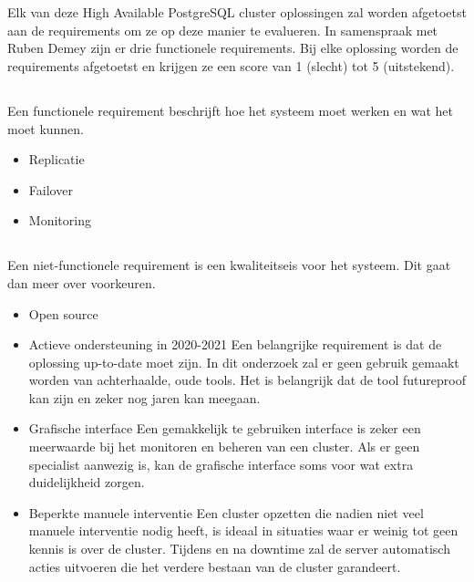 \section{}
\label{sec:Requirementsanalyse}

Elk van deze High Available PostgreSQL cluster oplossingen zal worden afgetoetst aan de requirements om ze op deze manier te evalueren. In samenspraak met Ruben Demey zijn er drie functionele requirements. Bij elke oplossing worden de requirements afgetoetst en krijgen ze een score van 1 (slecht) tot 5 (uitstekend).


\subsection{}
\label{subsec:Functionele Requirements}
Een functionele requirement beschrijft hoe het systeem moet werken en wat het moet kunnen.

\begin{itemize}
    \item Replicatie
    \item Failover
    \item Monitoring
\end{itemize}


\subsection{}
\label{subsec:Niet-functionele Requirements}
Een niet-functionele requirement is een kwaliteitseis voor het systeem. Dit gaat dan meer over voorkeuren.

\begin{itemize}
    \item Open source
    \item Actieve ondersteuning in 2020-2021
    \newline
    Een belangrijke requirement is dat de oplossing up-to-date moet zijn. In dit onderzoek zal er geen gebruik gemaakt worden van achterhaalde, oude tools. Het is belangrijk dat de tool futureproof kan zijn en zeker nog jaren kan meegaan.
    \item Grafische interface
    \newline
    Een gemakkelijk te gebruiken interface is zeker een meerwaarde bij het monitoren en beheren van een cluster. Als er geen specialist aanwezig is, kan de grafische interface soms voor wat extra duidelijkheid zorgen.
    \item Beperkte manuele interventie
    \newline
    Een cluster opzetten die nadien niet veel manuele interventie nodig heeft, is ideaal in situaties waar er weinig tot geen kennis is over de cluster. Tijdens en na downtime zal de server automatisch acties uitvoeren die het verdere bestaan van de cluster garandeert.
    
\end{itemize}


